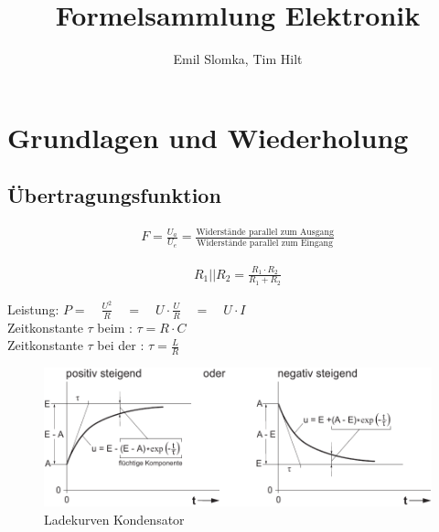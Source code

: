 \documentclass[a5paper, 12pt]{scrartcl}
\title{Formelsammlung Elektronik}
\author{Emil Slomka, Tim Hilt}
\begin{document}
\maketitle

\section{Grundlagen und Wiederholung}

\subsection{Übertragungsfunktion}
\begin{align*}
  F = \frac{U_a}{U_e} = \frac{\text{Widerstände parallel zum Ausgang}}{\text{Widerstände parallel zum Eingang}}
\end{align*}


\begin{align*}
  R_1 || R_2 = \frac{R_1 \cdot R_2}{R_1 + R_2}
\end{align*}

Leistung: \dotfill \(P = \quad \frac{U^2}{R} \quad = \quad U \cdot \frac{U}{R} \quad = \quad U \cdot I\)\\
Zeitkonstante \(\tau\) beim : \dotfill \(\tau = R \cdot C\)\\
Zeitkonstante \(\tau\) bei der : \dotfill \(\tau = \frac{L}{R}\)\\

\begin{figure}[H]
  \centering
  \includegraphics[width=.7\textwidth]{LadekurveKondensator}
  \caption{Ladekurven Kondensator }
\end{figure}

\end{document}
